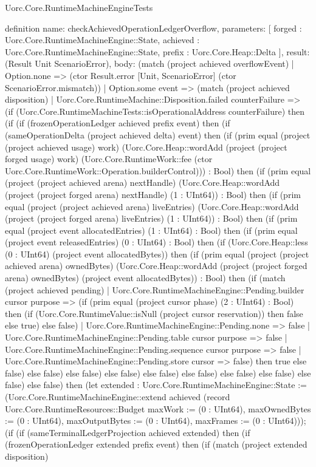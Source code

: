 \begin{lexlean}{Uorc.Core.RuntimeMachineEngineTests}
\begin{semanticmodule}
definition{
  name: checkAchievedOperationLedgerOverflow,
  parameters: [
    forged : Uorc.Core.RuntimeMachineEngine::State,
    achieved : Uorc.Core.RuntimeMachineEngine::State,
    prefix : Uorc.Core.Heap::Delta
  ],
  result: (Result Unit ScenarioError),
  body: (match (project achieved overflowEvent)
    | Option.none => (ctor Result.error [Unit, ScenarioError] (ctor ScenarioError.mismatch))
    | Option.some event => (match (project achieved disposition)
      | Uorc.Core.RuntimeMachine::Disposition.failed counterFailure => (if (Uorc.Core.RuntimeMachineTests::isOperationalAddress counterFailure) then (if (if (frozenOperationLedger achieved prefix event) then (if (sameOperationDelta (project achieved delta) event) then (if (prim equal (project (project achieved usage) work) (Uorc.Core.Heap::wordAdd (project (project forged usage) work) (Uorc.Core.RuntimeWork::fee (ctor Uorc.Core.RuntimeWork::Operation.builderControl))) : Bool) then (if (prim equal (project (project achieved arena) nextHandle) (Uorc.Core.Heap::wordAdd (project (project forged arena) nextHandle) (1 : UInt64)) : Bool) then (if (prim equal (project (project achieved arena) liveEntries) (Uorc.Core.Heap::wordAdd (project (project forged arena) liveEntries) (1 : UInt64)) : Bool) then (if (prim equal (project event allocatedEntries) (1 : UInt64) : Bool) then (if (prim equal (project event releasedEntries) (0 : UInt64) : Bool) then (if (Uorc.Core.Heap::less (0 : UInt64) (project event allocatedBytes)) then (if (prim equal (project (project achieved arena) ownedBytes) (Uorc.Core.Heap::wordAdd (project (project forged arena) ownedBytes) (project event allocatedBytes)) : Bool) then (if (match (project achieved pending)
        | Uorc.Core.RuntimeMachineEngine::Pending.builder cursor purpose => (if (prim equal (project cursor phase) (2 : UInt64) : Bool) then (if (Uorc.Core.RuntimeValue::isNull (project cursor reservation)) then false else true) else false)
        | Uorc.Core.RuntimeMachineEngine::Pending.none => false
        | Uorc.Core.RuntimeMachineEngine::Pending.table cursor purpose => false
        | Uorc.Core.RuntimeMachineEngine::Pending.sequence cursor purpose => false
        | Uorc.Core.RuntimeMachineEngine::Pending.store cursor => false) then true else false) else false) else false) else false) else false) else false) else false) else false) else false) else false) then (let extended : Uorc.Core.RuntimeMachineEngine::State := (Uorc.Core.RuntimeMachineEngine::extend achieved (record Uorc.Core.RuntimeResources::Budget {maxWork := (0 : UInt64), maxOwnedBytes := (0 : UInt64), maxOutputBytes := (0 : UInt64), maxFrames := (0 : UInt64)})); (if (if (sameTerminalLedgerProjection achieved extended) then (if (frozenOperationLedger extended prefix event) then (if (match (project extended disposition)
}
\end{semanticmodule}
\end{lexlean}
